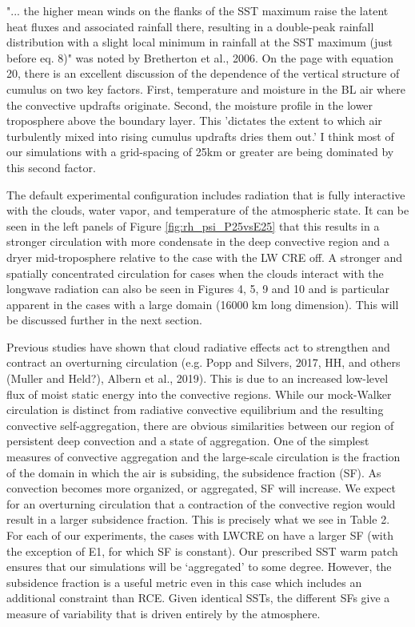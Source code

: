 \documentclass[draft]{agujournal2019}
\begin{document}
"... the higher mean winds on the flanks of the SST maximum raise the latent heat fluxes and associated rainfall there, resulting in a 
double-peak rainfall distribution with a slight local minimum in rainfall at the SST maximum (just before eq. 8)" 
was noted by Bretherton et al., 2006.  On the page with equation 20, there is an excellent discussion of the dependence of the 
vertical structure of cumulus on two key factors.  First, temperature and moisture in the BL air where the convective updrafts originate.
Second, the moisture profile in the lower troposphere above the boundary layer.  This 'dictates the extent to which air
turbulently mixed into rising cumulus updrafts dries them out.'  I think most of our simulations with a grid-spacing of 25km or 
greater are being dominated by this second factor.    

The default experimental configuration includes radiation that is fully interactive with the clouds, water vapor, and 
temperature of the atmospheric state.  It can be seen in the left panels of Figure \ref{fig:rh_psi_P25vsE25} that this 
results in a stronger circulation with more condensate in the deep convective region and a dryer mid-troposphere
relative to the case with the LW CRE off.   A stronger and spatially concentrated circulation for cases when the 
clouds interact with the longwave radiation can also be seen in Figures 4, 5, 9 and 10 and is particular apparent in 
the cases with a large domain (16000 km long dimension).  This will be discussed further in the next section.  

Previous studies have shown that cloud radiative effects act to strengthen and contract an overturning circulation 
(e.g. Popp and Silvers, 2017, HH, and others (Muller and Held?), Albern et al., 2019).  This is 
due to an increased low-level flux
of moist static energy into the convective regions.  While our mock-Walker circulation is distinct from radiative
convective equilibrium and the resulting convective self-aggregation, there are obvious similarities between our 
region of persistent deep convection and a state of aggregation.   One of the simplest measures of convective 
aggregation and the large-scale circulation is the fraction of the domain in which the air is subsiding, the 
subsidence fraction (SF).  As convection becomes more organized, or aggregated, SF will increase.  We expect 
for an overturning circulation that a contraction of the convective region would result in a larger subsidence 
fraction.  This is precisely what we see in Table 2.  For each of our experiments, the cases with LWCRE on
have a larger SF (with the exception of E1, for which SF is constant).  Our prescribed SST warm patch ensures that our simulations will 
be `aggregated' to some degree.  However, the subsidence fraction is a useful metric even in this case which 
includes an additional constraint than RCE.  Given identical SSTs, the different SFs give a measure of variability
that is driven entirely by the atmosphere.  
\end{document}
